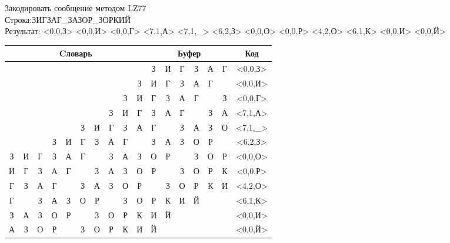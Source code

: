 \documentclass[a4paper, 12pt]{article}
\begin{document}
Закодировать сообщение методом LZ77\\
Строка:ЗИГЗАГ\_ЗАЗОР\_ЗОРКИЙ\\
Результат: <0,0,З> <0,0,И> <0,0,Г> <7,1,А> <7,1,\_> <6,2,З> <0,0,О> <0,0,Р> <4,2,О> <6,1,К> <0,0,И> <0,0,Й>\\
\begin{table}[h!]
\centering
\begin{tabular}{|c|c|c|c|c|c|c|c|c|c|c|c|c|c|c|c|c|} 
\hline
\multicolumn{10}{|c|}{Cловарь} & \multicolumn{6}{c|}{Буфер} & Код  \\ \hline
  &   &   &   &   &   &   &   &   &   & \cellcolor[HTML]{8CE4F6} З & И & Г & З & А & Г & <0,0,З>
\\ \hline
  &   &   &   &   &   &   &   &   & З & \cellcolor[HTML]{8CE4F6} И & Г & З & А & Г &   & <0,0,И>
\\ \hline
  &   &   &   &   &   &   &   & З & И & \cellcolor[HTML]{8CE4F6} Г & З & А & Г &   & З & <0,0,Г>
\\ \hline
  &   &   &   &   &   &   & \cellcolor[HTML]{FFFF00} З & И & Г & \cellcolor[HTML]{FFFF00} З & \cellcolor[HTML]{8CE4F6} А & Г &   & З & А & <7,1,А>
\\ \hline
  &   &   &   &   & З & И & \cellcolor[HTML]{FFFF00} Г & З & А & \cellcolor[HTML]{FFFF00} Г & \cellcolor[HTML]{8CE4F6}   & З & А & З & О & <7,1,\_>
\\ \hline
  &   &   & З & И & Г & \cellcolor[HTML]{FFFF00} З & \cellcolor[HTML]{FFFF00} А & Г &   & \cellcolor[HTML]{FFFF00} З & \cellcolor[HTML]{FFFF00} А & \cellcolor[HTML]{8CE4F6} З & О & Р &   & <6,2,З>
\\ \hline
З & И & Г & З & А & Г &   & З & А & З & \cellcolor[HTML]{8CE4F6} О & Р &   & З & О & Р & <0,0,О>
\\ \hline
И & Г & З & А & Г &   & З & А & З & О & \cellcolor[HTML]{8CE4F6} Р &   & З & О & Р & К & <0,0,Р>
\\ \hline
Г & З & А & Г & \cellcolor[HTML]{FFFF00}   & \cellcolor[HTML]{FFFF00} З & А & З & О & Р & \cellcolor[HTML]{FFFF00}   & \cellcolor[HTML]{FFFF00} З & \cellcolor[HTML]{8CE4F6} О & Р & К & И & <4,2,О>
\\ \hline
Г &   & З & А & З & О & \cellcolor[HTML]{FFFF00} Р &   & З & О & \cellcolor[HTML]{FFFF00} Р & \cellcolor[HTML]{8CE4F6} К & И & Й &   &   & <6,1,К>
\\ \hline
З & А & З & О & Р &   & З & О & Р & К & \cellcolor[HTML]{8CE4F6} И & Й &   &   &   &   & <0,0,И>
\\ \hline
А & З & О & Р &   & З & О & Р & К & И & \cellcolor[HTML]{8CE4F6} Й &   &   &   &   &   & <0,0,Й>
\\ \hline
\end{tabular}
\end{table}
\end{document}

